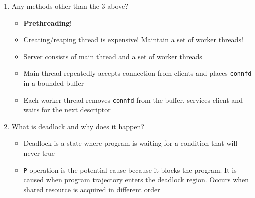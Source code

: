 \documentclass[12pt]{article}
\begin{document}
{\begin{enumerate}
\begin{itemize}
\begin{itemize}
		\end{itemize}
		\item Event Based: Maintains a set of active connections by an array of \texttt{connfd}s
		\begin{itemize}
			\item One logical control flow and shared address space
			\item Can single step with debugger
			\item No process or thread control overhead
			\item More control over the behavior
			\item Too complex
			\item Hard to provide fine-grained concurrency
			\item Cannot take advantage of multi-core
		\end{itemize}
		\item Thread Based: Separate thread for each client
		\begin{itemize}
			\item Easy to share data between threads
			\item Efficient than processes, cheaper context switch
			\item May cause unintended sharing
			\item Difficult to debug, errors hard to reproduce
		\end{itemize}
	\end{itemize}
	\item Any methods other than the 3 above?
	\begin{itemize}
		\item \textbf{Prethreading}!
		\item Creating/reaping thread is expensive! Maintain a set of worker threads!
		\item Server consists of main thread and a set of worker threads
		\item Main thread repeatedly accepts connection from clients and places \texttt{connfd} in a bounded buffer
		\item Each worker thread removes \texttt{connfd} from the buffer, services client and waits for
		the next descriptor
	\end{itemize}
	\item What is deadlock and why does it happen?
	\begin{itemize}
		\item Deadlock is a state where program is waiting for a condition that will never true
		\item \texttt{P} operation is the potential cause because it blocks the program. It is caused when program trajectory enters the deadlock region. Occurs when shared resource is acquired in different order

\end{itemize}
\end{enumerate}}
\end{document}
